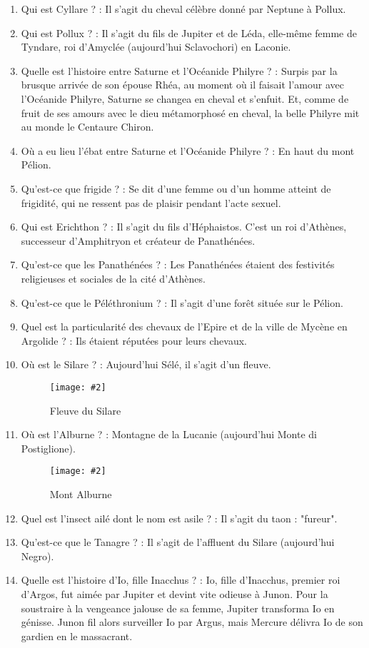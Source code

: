 \documentclass[a4paper, 11pt, hidelinks]{article}
\newcommand{\img}[4]{\begin{figure}[!ht]
    \centering
    \texttt{[image: \#2]}
    \caption{#3}
    \label{#4}
    \end{figure} }
\begin{document}
\begin{enumerate}
            \img{0.5}{Alezan.jpg}{Alezan}{118}
      \item Qui est Cyllare ? : Il s'agit du cheval célèbre donné par Neptune à Pollux.
      \item Qui est Pollux ? : Il s'agit du fils de Jupiter et de Léda, elle-même femme de Tyndare, roi d'Amyclée (aujourd'hui Sclavochori) en Laconie.
      \item Quelle est l'histoire entre Saturne et l'Océanide Philyre ? : Surpis par la brusque arrivée de son épouse Rhéa, au moment où il faisait l'amour avec l'Océanide Philyre,
            Saturne se changea en cheval et s'enfuit. Et, comme de fruit de ses amours avec le dieu métamorphosé en cheval, la belle Philyre mit au monde le Centaure Chiron.
      \item Où a eu lieu l'ébat entre Saturne et l'Océanide Philyre ? : En haut du mont Pélion.
      \item Qu'est-ce que frigide ? : Se dit d'une femme ou d'un homme atteint de frigidité, qui ne ressent pas de plaisir pendant l'acte sexuel.
      \item Qui est Erichthon ? : Il s'agit du fils d'Héphaistos. C'est un roi d'Athènes, successeur d'Amphitryon et créateur de Panathénées.
      \item Qu'est-ce que les Panathénées ? : Les Panathénées étaient des festivités religieuses et sociales de la cité d'Athènes.
      \item Qu'est-ce que le Péléthronium ? : Il s'agit d'une forêt située sur le Pélion.
      \item Quel est la particularité des chevaux de l'Epire et de la ville de Mycène en Argolide ? : Ils étaient réputées pour leurs chevaux.
      \item Où est le Silare ? : Aujourd'hui Sélé, il s'agit d'un fleuve.
            \img{0.4}{Sélé.png}{Fleuve du Silare}{119}
      \item Où est l'Alburne ? : Montagne de la Lucanie (aujourd'hui Monte di Postiglione).
            \img{0.5}{Alburne.png}{Mont Alburne}{120}
      \item Quel est l'insect ailé dont le nom est asile ? : Il s'agit du taon : "fureur".
      \item Qu'est-ce que le Tanagre ? : Il s'agit de l'affluent du Silare (aujourd'hui Negro).
      \item Quelle est l'histoire d'Io, fille Inacchus ? : Io, fille d'Inacchus, premier roi d'Argos, fut aimée par Jupiter et devint vite odieuse à Junon. Pour la soustraire à
            la vengeance jalouse de sa femme, Jupiter transforma Io en génisse. Junon fil alors surveiller Io par Argus, mais Mercure délivra Io de son gardien en le massacrant.

\end{enumerate}
\end{document}
